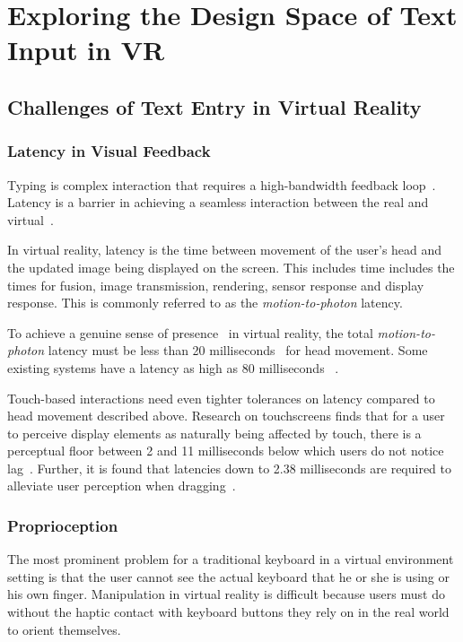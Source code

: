 \section{Exploring the Design Space of Text Input in VR}

\subsection{Challenges of Text Entry in Virtual Reality}

\subsubsection{Latency in Visual Feedback}
Typing is complex interaction that requires a high-bandwidth feedback loop~\cite{McGill:2015:DRO:2702123.2702382}.
Latency is a barrier in achieving a seamless interaction between the real and virtual~\cite{leedesigning}.

In virtual reality, latency is the time between movement of the user's head and the updated image being displayed on the screen.  
This includes time includes the times for fusion, image transmission,
rendering, sensor response and display response.
This is commonly referred to as the \textit{motion-to-photon} latency.

To achieve a genuine sense of presence~\cite{schuemie2001research} in virtual reality, the total \textit{motion-to-photon} latency must be less than 20 milliseconds~\cite{jerald2009relating,jerald2010scene,bailey2004latency} for head movement.
Some existing systems have a latency as high as 80 milliseconds ~\cite{lincoln2016motion,dallaire2016animated}.

Touch-based interactions need even tighter tolerances on latency compared to head movement described above.
Research on touchscreens finds that for a user to perceive display elements as naturally being affected by touch, there is a perceptual floor between 2  and 11 milliseconds below which users do not notice lag~\cite{Jota:2013:FFE:2470654.2481317,Ng:2012:DLD:2380116.2380174}.
Further, it is found that latencies down to 2.38 milliseconds are required to alleviate user perception when dragging~\cite{Jota:2013:FFE:2470654.2481317,Ng:2012:DLD:2380116.2380174}.

\subsubsection{Proprioception}
The most prominent problem for a traditional keyboard in a virtual environment setting is that the user cannot see the actual keyboard that he or she is using or his own finger.
Manipulation in virtual reality is difficult because users must do without the haptic contact with keyboard buttons they rely on in the real world to orient themselves.

